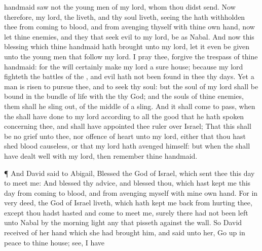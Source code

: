 {handmaid
saw not the young
men of my
lord, whom thou didst
send.
Now therefore, my
lord,
{} the
{}
liveth, and
{} thy
soul
liveth, seeing the
{} hath
withholden thee from
coming to
{}
blood, and from
avenging thyself with thine own
hand, now let thine
enemies, and they that
seek
evil to my
lord, be as
Nabal.
And now this
blessing which thine
handmaid hath
brought unto my
lord, let it even be
given unto the young
men that
follow my
lord.
I pray thee,
forgive the
trespass of thine
handmaid: for the
{} will
certainly
make my
lord a
sure
house; because my
lord
fighteth the
battles of the
{}, and
evil hath not been
found in thee
{} thy
days.
Yet a
man is
risen to
pursue thee, and to
seek thy
soul: but the
soul of my
lord shall be
bound in the
bundle of
life with the
{} thy
God; and the
souls of thine
enemies, them shall he sling
out,
{} of the
middle of a
sling.
And it shall come to pass, when the
{} shall have
done to my
lord according to all the
good that he hath
spoken concerning thee, and shall have
appointed thee
ruler over
Israel;
That this shall be no
grief unto thee, nor
offence of
heart unto my
lord, either that thou hast
shed
blood
causeless, or that my
lord hath
avenged himself: but when the
{} shall have dealt
well with my
lord, then
remember thine
handmaid.
\par }{\PP {}¶ And
David
said to
Abigail,
Blessed
{} the
{}
God of
Israel, which
sent thee this
day to
meet me:
And
blessed
{} thy
advice, and
blessed
{} thou, which hast
kept me this
day from
coming to
{}
blood, and from
avenging myself with mine own
hand.
For in very
deed,
{} the
{}
God of
Israel
liveth, which hath kept me
back from
hurting thee,
except thou hadst
hasted and
come to
meet me, surely there had not been
left unto
Nabal by the
morning
light any that
pisseth against the
wall.
So
David
received of her
hand
{} which she had
brought him, and
said unto her, Go
up in
peace to thine
house;
see, I have
}
